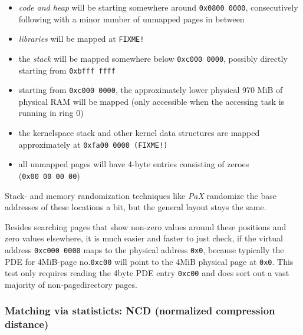 \begin{itemize}

	\item \emph{code and heap} will be starting somewhere around
	\texttt{0x0800~0000}, consecutively following with a minor number of
	unmapped pages in between

	\item \emph{libraries} will be mapped at \texttt{FIXME!}

	\item the \emph{stack} will be mapped somewhere below
	\texttt{0xc000~0000}, possibly directly starting from
	\texttt{0xbfff~ffff}

	\item starting from \texttt{0xc000~0000}, the approximately lower
	physical 970 MiB of physical RAM will be mapped (only accessible when
	the accessing task is running in ring 0)

	\item the kernelspace stack and other kernel data structures are mapped
	approximately at \texttt{0xfa00~0000 (FIXME!)}

	\item all unmapped pages will have 4-byte entries consisting of zeroes
	(\texttt{0x00~00~00~00})

\end{itemize}

Stack- and memory randomization techniques like \emph{PaX} randomize the base
addresses of these locations a bit, but the general layout stays the same.

Besides searching pages that show non-zero values around these positions and
zero values elsewhere, it is much easier and faster to just check, if the
virtual address \texttt{0xc000~0000} maps to the physical address \texttt{0x0},
because typically the PDE for 4MiB-page no.\@ \texttt{0xc00} will point to the
4MiB physical page at \texttt{0x0}. This test only requires reading the 4byte
PDE entry \texttt{0xc00} and does sort out a vast majority of non-pagedirectory
pages.



\subsubsection{Matching via statisticts: NCD (normalized compression distance)}

